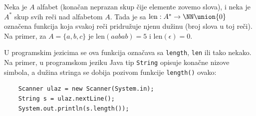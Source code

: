 \begin{EX}\label{ft08.ex.strlen}
  Neka je $A$ alfabet (kona\v can neprazan skup \v cije elemente zovemo slova), i neka je $A^*$ skup svih
  re\v ci nad alfabetom $A$. Tada je sa $\mathrm{len} : A^* \to \NN \union \{0\}$ ozna\v cena funkcija koja
  svakoj re\v ci pridru\v zuje njenu du\v zinu (broj slova u toj re\v ci). Na primer, za $A = \{a, b, c\}$
  je $\mathrm{len}(aabab) = 5$ i $\mathrm{len}(\epsilon) = 0$.
  
  U programskim jezicima se ova funkcija ozna\v cava sa \verb`length`, \verb`len` ili tako nekako. Na primer,
  u programskom jeziku Java tip \verb`String` opisuje kona\v cne nizove simbola, a du\v zina stringa se
  dobija pozivom funkcije \verb`length()` ovako:
{\small
\begin{verbatim}
    Scanner ulaz = new Scanner(System.in);
    String s = ulaz.nextLine();
    System.out.println(s.length());
\end{verbatim}
}
\end{EX}

